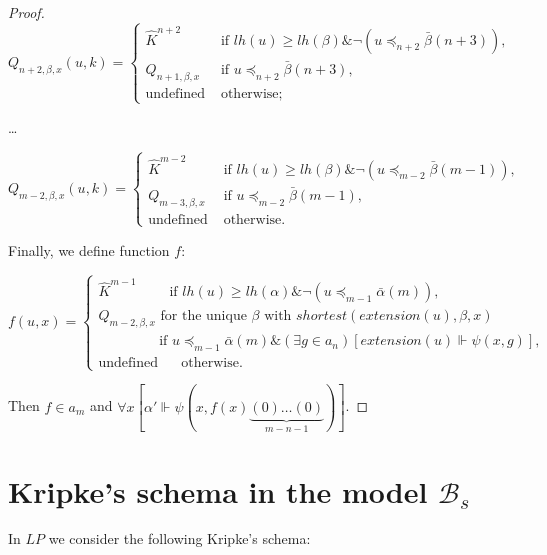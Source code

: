 \documentclass{asl}
\theoremstyle{definition}
\begin{document}
\begin{proof}
\begin{displaymath}
Q_{n+2,\beta,x}(u,k)=
\begin{cases}
\widehat{K}^{n+2} & \text{if } lh(u)\geqslant lh(\beta) \& \neg(u\preccurlyeq_{n+2}\bar{\beta}(n+3)),\\
Q_{n+1,\beta, x}  & \text{if } u\preccurlyeq_{n+2}\bar{\beta}(n+3),\\
\text{undefined } & \text{otherwise;}
\end{cases}
\end{displaymath} 

\begin{center}
\ldots
\end{center}

\begin{displaymath}
Q_{m-2,\beta,x}(u,k)=
\begin{cases}
\widehat{K}^{m-2} & \text{if } lh(u)\geqslant lh(\beta) \& \neg(u\preccurlyeq_{m-2}\bar{\beta}(m-1)),\\
Q_{m-3,\beta, x}  & \text{if } u\preccurlyeq_{m-2}\bar{\beta}(m-1),\\
\text{undefined } & \text{otherwise.}
\end{cases}
\end{displaymath} 

Finally, we define function $f$:

\begin{displaymath}
f(u,x)=
\begin{cases}
\widehat{K}^{m-1} \qquad \text{ if } lh(u)\geqslant lh(\alpha) \& \neg(u\preccurlyeq_{m-1}\bar{\alpha}(m)),\\
Q_{m-2,\beta, x} \text{ for the unique } \beta \text{ with } shortest(extension(u),\beta,x) \\ 
\qquad \qquad \text{ if } u\preccurlyeq_{m-1}\bar{\alpha}(m) \& (\exists g\in a_n)\left[extension(u)\Vdash \psi(x,g)\right] ,\\
\text{undefined } \quad \text{ otherwise.}
\end{cases}
\end{displaymath} 

Then $f\in a_m$ and $\forall x[\alpha' \Vdash \psi(x,f(x)\underbrace{(0)\ldots(0)}_{m-n-1})] $.
\end{proof}

\section{Kripke's schema in the model $\mathcal{B}_s$}
In $ LP $ we consider the following Kripke's schema:
\end{document}
